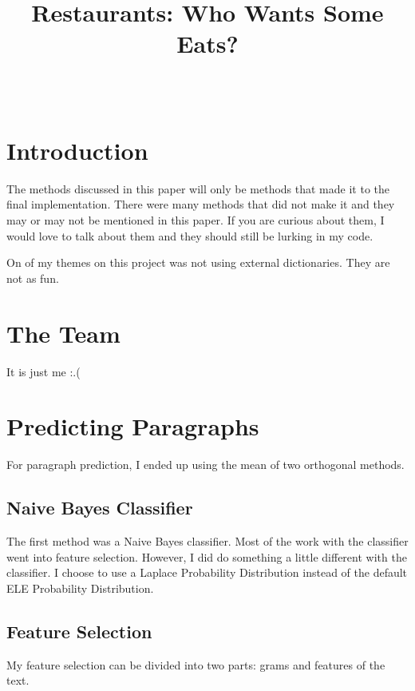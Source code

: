 \documentclass[]{IEEEtran}
\begin{document}
\title{Restaurants: Who Wants Some Eats?}


\author{
\\
}

\maketitle

\thispagestyle{empty}
\pagestyle{empty}

\section{Introduction}
The methods discussed in this paper will only be methods that made it to the final implementation.
There were many methods that did not make it and they may or may not be mentioned in this paper.
If you are curious about them, I would love to talk about them and they should still be lurking in
my code.

On of my themes on this project was not using external dictionaries. They are not as fun.

\section{The Team}
It is just me :.(

\section{Predicting Paragraphs}
For paragraph prediction, I ended up using the mean of two orthogonal methods.

\subsection{Naive Bayes Classifier}
The first method was a Naive Bayes classifier. Most of the work with the classifier went into feature selection.
However, I did do something a little different with the classifier. I choose to use a Laplace Probability Distribution
instead of the default ELE Probability Distribution.

\subsection{Feature Selection}
My feature selection can be divided into two parts: grams and features of the text.
\end{document}
